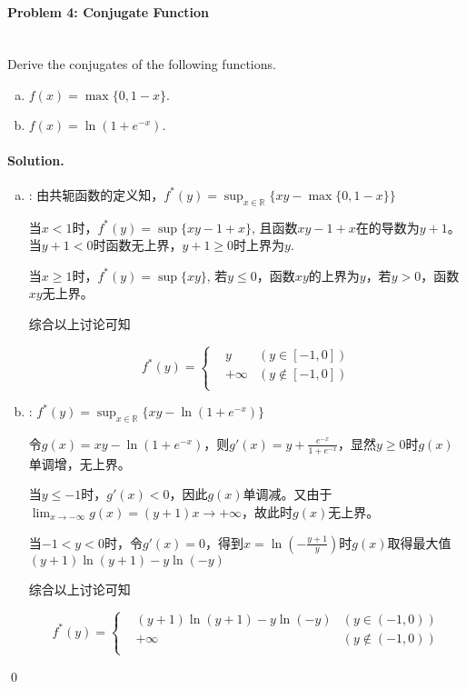 \documentclass[a4paper]{article}
\newenvironment{solution}
{\color{blue} \paragraph{Solution.}}
{\newline \qed}
\begin{document}
\paragraph{Problem 4: Conjugate Function}
~\\
Derive the conjugates of the following functions.
\begin{enumerate}[a)]
    \item $f(x)=\max\{0,1-x\}.$
    \item $f(x)=\ln(1+e^{-x}).$
\end{enumerate}
\begin{solution}
    \begin{enumerate}[a)]
        \item : 由共轭函数的定义知，$f^*(y) = \sup_{x\in \mathbb{R}}\{xy-\max\{0, 1-x\}\}$
        
                当$x<1$时，$f^*(y) = \sup\{xy-1+x\}$, 且函数$xy-1+x$在的导数为$y+1$。当$y+1<0$时函数无上界，$y+1\geq0$时上界为$y$.

                当$x\geq 1$时，$f^*(y) = \sup\{xy\}$, 若$y\leq 0$，函数$xy$的上界为$y$，若$y>0$，函数$xy$无上界。

                综合以上讨论可知

                $$ f^*(y)=\left\{
                \begin{aligned}
                & y &(y\in [-1, 0]) \\
                & +\infty &(y \notin [-1, 0]) \\
                \end{aligned}
                \right.
                $$

        \item : $f^*(y) = \sup_{x\in \mathbb{R}} \{xy-\ln(1+e^{-x})\}$
        
                令$g(x) = xy-\ln(1+e^{-x})$，则$g'(x)=y+\frac{e^{-x}}{1+e^{-x}}$，显然$y\geq 0$时$g(x)$单调增，无上界。

                当$y\leq -1$时，$g'(x)<0$，因此$g(x)$单调减。又由于$\lim_{x\rightarrow -\infty} g(x)=(y+1)x\rightarrow +\infty$，故此时$g(x)$无上界。

                当$-1 < y<0$时，令$g'(x)=0$，得到$x=\ln(-\frac{y+1}{y})$时$g(x)$取得最大值$(y+1)\ln(y+1)-y\ln(-y)$

                综合以上讨论可知

                $$ f^*(y)=\left\{
                \begin{aligned}
                & (y+1)\ln(y+1)-y\ln(-y) &(y\in (-1, 0)) \\
                & +\infty &(y \notin (-1, 0)) \\
                \end{aligned}
                \right.
                $$

    \end{enumerate}
\end{solution}
\end{document}
